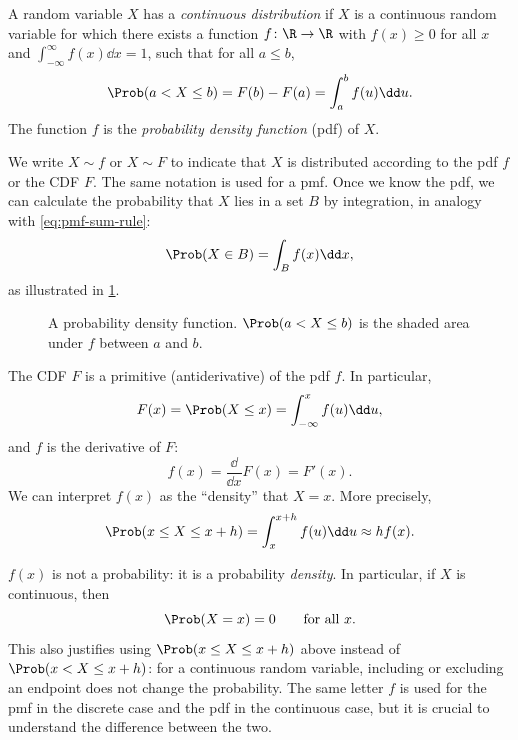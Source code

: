\begin{definition}\label{def:continuous-distribution}
A random variable $X$ has a \emph{continuous distribution} if $X$ is a continuous random variable for which there exists a function $f \colon \R \to \R$ with $f(x) \ge 0$ for all $x$ and $\int_{-\infty}^{\infty} f(x) \dd x = 1$, such that for all $a \le b$,
\[
  \Prob(a < X \le b) = F(b) - F(a) = \int_a^b f(u) \dd u.
\]
The function $f$ is the \emph{probability density function} (pdf) of $X$.
\end{definition}

We write $X \sim f$ or $X \sim F$ to indicate that $X$ is distributed according to the pdf $f$ or the CDF $F$. The same notation is used for a pmf. Once we know the pdf, we can calculate the probability that $X$ lies in a set $B$ by integration, in analogy with \eqref{eq:pmf-sum-rule}:
\begin{equation}\label{eq:pdf-integral-rule}
  \Prob(X \in B) = \int_B f(x) \dd x,
\end{equation}
as illustrated in \cref{fig:pdf-integral-rule}.

\begin{figure}[ht]
\centering
{}
\caption{A probability density function. $\Prob(a < X \le b)$ is the shaded area under $f$ between $a$ and $b$.}
\label{fig:pdf-integral-rule}
\end{figure}

The CDF $F$ is a primitive (antiderivative) of the pdf $f$. In particular,
\[
  F(x) = \Prob(X \le x) = \int_{-\infty}^x f(u) \dd u,
\]
and $f$ is the derivative of $F$:
\[
  f(x) = \frac{\dd}{\dd x} F(x) = F'(x).
\]
We can interpret $f(x)$ as the ``density'' that $X = x$. More precisely,
\[
  \Prob(x \le X \le x + h) = \int_x^{x + h} f(u) \dd u \approx h f(x).
\]

\begin{remark}\label{rem:density-not-probability}
$f(x)$ is not a probability: it is a probability \emph{density}. In particular, if $X$ is continuous, then
\[
  \Prob(X = x) = 0 \qquad \text{for all } x.
\]
This also justifies using $\Prob(x \le X \le x + h)$ above instead of $\Prob(x < X \le x + h)$: for a continuous random variable, including or excluding an endpoint does not change the probability. The same letter $f$ is used for the pmf in the discrete case and the pdf in the continuous case, but it is crucial to understand the difference between the two.
\end{remark}

